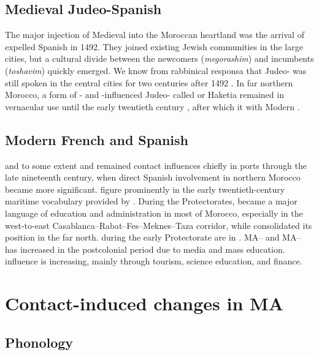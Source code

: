 \documentclass[output=paper]{langsci/langscibook}
\begin{document}
\subsection{Medieval Judeo-Spanish}

The major injection of Medieval  into the Moroccan heartland was the arrival of expelled Spanish  in 1492. They joined existing Jewish communities in the large cities, but a cultural divide between the newcomers (\textit{megorashim}) and incumbents (\textit{toshavim}) quickly emerged. We know from rabbinical responsa that Judeo- was still spoken in the central cities for two centuries after 1492 \citep{Chetrit1985}. In far northern Morocco, a form of - and -influenced Judeo- called  or Haketia remained in vernacular use until the early twentieth century \citep{Benoliel1977}, after which it  with Modern .

\subsection{Modern French and Spanish}

 and to some extent  and  remained contact influences chiefly in ports through the late nineteenth century, when direct Spanish involvement in northern Morocco became more significant.   figure prominently in the early twentieth-century maritime vocabulary provided by \citet{Brunot1920}. During the Protectorates,  became a major language of education and administration in most of Morocco, especially in the west-to-east Casablanca–Rabat–Fes–Meknes–Taza corridor, while  consolidated its position in the far north.   during the early Protectorate are in \citet{Brunot1949}. MA– and MA–  has increased in the postcolonial period due to media and mass education.  influence is increasing, mainly through tourism, science education, and finance.

\section{Contact-induced changes in MA}

\subsection{Phonology}
\end{document}
